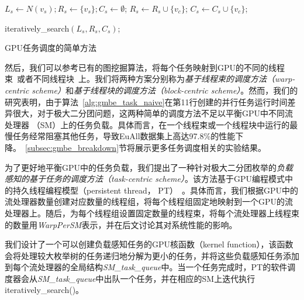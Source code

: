 \begin{algorithm} [H]
  \begin{algorithmic}[1]
    \normalsize
    
      \STATE $L_s \leftarrow N(v_s); R_s\leftarrow\{v_s\}; C_s\leftarrow \emptyset $;
          \STATE $R_s \leftarrow R_s \cup \{v_c\}$;
          \STATE $C_s \leftarrow C_s \cup \{v_c\}$;
        \ENDIF 
      \ENDFOR

        \STATE \textsf{iteratively\_search}$(L_s,R_s,C_s)$;
      \ENDIF

    \ENDFOR

  \end{algorithmic}
  \caption{GPU任务调度的简单方法}
  \label{alg:gmbe_task_naive}
\end{algorithm}


然后，我们可以参考已有的图挖掘算法，将每个任务映射到GPU的不同的线程束~\cite{g2miner22}或者不同线程块~\cite{Kclique22}上。我们将两种方案分别称为\textit{基于线程束的调度方法（warp-centric scheme）}和\textit{基于线程块的调度方法（block-centric scheme）}。然而，我们的研究表明，由于算法~\ref{alg:gmbe_task_naive}在第11行创建的并行任务运行时间差异很大，对于极大二分团问题，这两种简单的调度方法不足以平衡GPU中不同流处理器 （SM）上的任务负载。具体而言，在一个线程束或一个线程块中运行的最慢任务经常阻塞其他任务，导致EuAll数据集上高达97.8\%的性能下降。~\ref{subsec:gmbe_breakdown}节将展示更多任务调度相关的实验结果。




为了更好地平衡GPU中的任务负载，我们提出了一种针对极大二分团枚举的\textit{负载感知的基于任务的调度方法（task-centric scheme）}。该方法基于GPU编程模式中的持久线程编程模型（persistent thread， PT）~\cite{PersistentThread12}。具体而言，我们根据GPU中的流处理器数量创建对应数量的线程组，将每个线程组固定地映射到一个GPU的流处理器上。随后，为每个线程组设置固定数量的线程束，将每个流处理器上线程束的数量用\textit{WarpPerSM}表示，并在后文讨论其对系统性能的影响。



我们设计了一个可以创建负载感知任务的GPU核函数（kernel function），该函数会将处理较大枚举树的任务递归地分解为更小的任务，并将这些负载感知任务添加到每个流处理器的全局结构\textit{SM\_task\_queue}中。当一个任务完成时，PT的软件调度器会从\textit{SM\_task\_queue}中出队一个任务，并在相应的SM上迭代执行\textsf{}{iteratively\_search()}。

